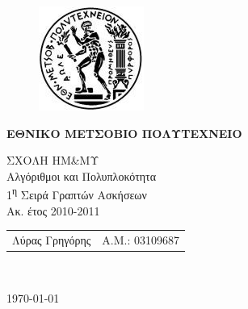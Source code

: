 \begin{titlepage}
\begin{center}
\begin{figure}[t] 
     \includegraphics[scale=0.7]{title/ntua_logo}
\end{figure}
\begin{LARGE}\textbf{ΕΘΝΙΚΟ ΜΕΤΣΟΒΙΟ ΠΟΛΥΤΕΧΝΕΙΟ\\}\end{LARGE}
\vspace{5cm}
\begin{Large}
ΣΧΟΛΗ ΗΜ\&ΜΥ\\
Αλγόριθμοι και Πολυπλοκότητα\\
1\textsuperscript{η} Σειρά Γραπτών Ασκήσεων\\
Ακ. έτος 2010-2011\\
\end{Large}
\vspace{10cm}
\begin{tabular}{l r}
\Large{Λύρας Γρηγόρης}&
\large{Α.Μ.: 03109687}\\
\end{tabular}\\
\vspace{1cm}

\vfill
\large\today\\
\end{center}
\end{titlepage}

